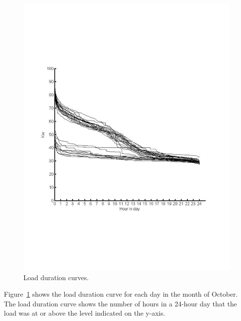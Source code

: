 \begin{figure}[htb!]
\begin{center}
\includegraphics[scale=0.4]{figs/LoadDurationCurvesWholeBuildingBLACK}
\caption{Load duration curves.}
\label{fig:ldc}
\end{center}
\end{figure}

Figure~\ref{fig:ldc} shows the load duration curve for each day in the month of October.  The load duration
curve shows the number of hours in a 24-hour day that the load was at or above the level indicated on the 
y-axis.

